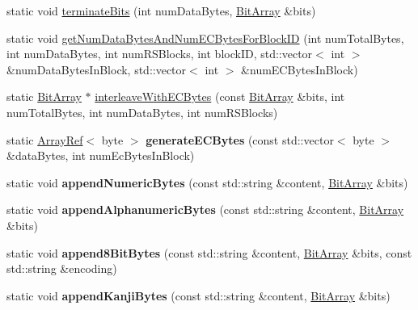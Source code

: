 \begin{DoxyCompactItemize}
\item 
static void \mbox{\hyperlink{classzxing_1_1qrcode_1_1_encoder_acded0fc88e15822a03865e6c79591770}{terminate\+Bits}} (int num\+Data\+Bytes, \mbox{\hyperlink{classzxing_1_1_bit_array}{Bit\+Array}} \&bits)
\item 
static void \mbox{\hyperlink{classzxing_1_1qrcode_1_1_encoder_a2ca7def3abfac0b589fb2192bb33598d}{get\+Num\+Data\+Bytes\+And\+Num\+E\+C\+Bytes\+For\+Block\+ID}} (int num\+Total\+Bytes, int num\+Data\+Bytes, int num\+R\+S\+Blocks, int block\+ID, std\+::vector$<$ int $>$ \&num\+Data\+Bytes\+In\+Block, std\+::vector$<$ int $>$ \&num\+E\+C\+Bytes\+In\+Block)
\item 
static \mbox{\hyperlink{classzxing_1_1_bit_array}{Bit\+Array}} $\ast$ \mbox{\hyperlink{classzxing_1_1qrcode_1_1_encoder_a56e0adac48f552a92621f7510df2412f}{interleave\+With\+E\+C\+Bytes}} (const \mbox{\hyperlink{classzxing_1_1_bit_array}{Bit\+Array}} \&bits, int num\+Total\+Bytes, int num\+Data\+Bytes, int num\+R\+S\+Blocks)
\item 
\mbox{\label{classzxing_1_1qrcode_1_1_encoder_a2beab277aa8d23fba54503850f664aac}} 
static \mbox{\hyperlink{classzxing_1_1_array_ref}{Array\+Ref}}$<$ byte $>$ {\bfseries generate\+E\+C\+Bytes} (const std\+::vector$<$ byte $>$ \&data\+Bytes, int num\+Ec\+Bytes\+In\+Block)
\item 
\mbox{\label{classzxing_1_1qrcode_1_1_encoder_ae2d7a1f1874273d3bcd0b8b3f49d0e05}} 
static void {\bfseries append\+Numeric\+Bytes} (const std\+::string \&content, \mbox{\hyperlink{classzxing_1_1_bit_array}{Bit\+Array}} \&bits)
\item 
\mbox{\label{classzxing_1_1qrcode_1_1_encoder_a97885af891389883ab53eef452e4c4bc}} 
static void {\bfseries append\+Alphanumeric\+Bytes} (const std\+::string \&content, \mbox{\hyperlink{classzxing_1_1_bit_array}{Bit\+Array}} \&bits)
\item 
\mbox{\label{classzxing_1_1qrcode_1_1_encoder_a2e0137bb5e526ad43a2ad535b2b5bc21}} 
static void {\bfseries append8\+Bit\+Bytes} (const std\+::string \&content, \mbox{\hyperlink{classzxing_1_1_bit_array}{Bit\+Array}} \&bits, const std\+::string \&encoding)
\item 
\mbox{\label{classzxing_1_1qrcode_1_1_encoder_a9a26bea95958a57177ed9131fb6d15f3}} 
static void {\bfseries append\+Kanji\+Bytes} (const std\+::string \&content, \mbox{\hyperlink{classzxing_1_1_bit_array}{Bit\+Array}} \&bits)
\end{DoxyCompactItemize}


